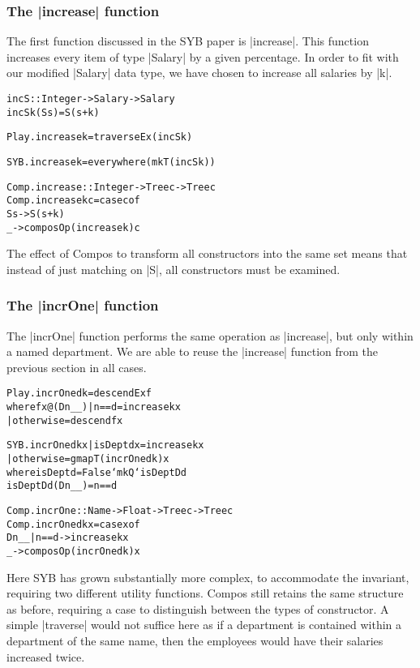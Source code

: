\documentclass[preprint]{sigplanconf}
\newenvironment{code}{\begin{alltt}\small}{\end{alltt}}
\begin{document}
\subsubsection{The |increase| function}

The first function discussed in the SYB paper is |increase|. This function increases every item of type |Salary| by a given percentage. In order to fit with our modified |Salary| data type, we have chosen to increase all salaries by |k|.

\begin{code}
incS :: Integer -> Salary -> Salary
incS k (S s) = S (s + k)

Play.increase k = traverseEx (incS k)

SYB.increase k = everywhere (mkT (incS k))

Comp.increase :: Integer -> Tree c -> Tree c
Comp.increase k c = case c of
    S s -> S (s + k)
    _ -> composOp (increase k) c
\end{code}

The effect of Compos to transform all constructors into the same set means that instead of just matching on |S|, all constructors must be examined.

\subsubsection{The |incrOne| function}

The |incrOne| function performs the same operation as |increase|, but only within a named department. We are able to reuse the |increase| function from the previous section in all cases.

\begin{code}
Play.incrOne d k = descendEx f
    where f x@(D n _ _)  | n == d     = increase k x
                         | otherwise  = descend f x

SYB.incrOne d k x  | isDept d x  = increase k x
                   | otherwise   = gmapT (incrOne d k) x
    where  isDept   d = False `mkQ` isDeptD d
           isDeptD  d (D n _ _) = n == d

Comp.incrOne :: Name -> Float -> Tree c -> Tree c
Comp.incrOne d k x = case x of
    D n _ _ | n == d -> increase k x
    _ -> composOp (incrOne d k) x
\end{code}

Here SYB has grown substantially more complex, to accommodate the invariant, requiring two different utility functions. Compos still retains the same structure as before, requiring a case to distinguish between the types of constructor. A simple |traverse| would not suffice here as if a department is contained within a department of the same name, then the employees would have their salaries increased twice.
\end{document}
